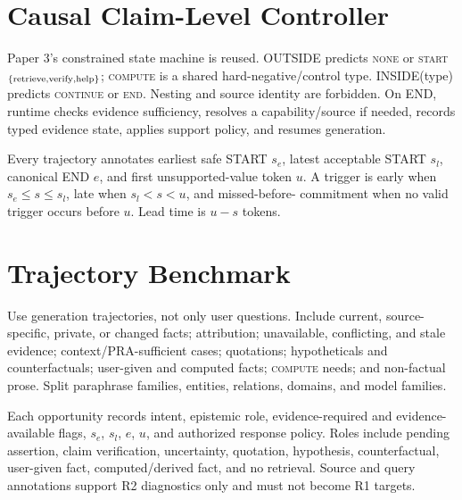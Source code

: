 \documentclass[10pt]{article}
\begin{document}
\section{Causal Claim-Level Controller}
Paper 3's constrained state machine is reused. OUTSIDE predicts \textsc{none}
or \textsc{start}$_{\{\rm retrieve,verify,help\}}$; \textsc{compute} is a shared
hard-negative/control type. INSIDE(type) predicts \textsc{continue} or
\textsc{end}. Nesting and source identity are forbidden. On END, runtime checks
evidence sufficiency, resolves a capability/source if needed, records typed
evidence state, applies support policy, and resumes generation.

Every trajectory annotates earliest safe START $s_e$, latest acceptable START
$s_l$, canonical END $e$, and first unsupported-value token $u$. A trigger is
early when $s_e\leq s\leq s_l$, late when $s_l<s<u$, and missed-before-
commitment when no valid trigger occurs before $u$. Lead time is $u-s$ tokens.

\section{Trajectory Benchmark}
Use generation trajectories, not only user questions. Include current,
source-specific, private, or changed facts; attribution; unavailable,
conflicting, and stale evidence; context/PRA-sufficient cases; quotations;
hypotheticals and counterfactuals; user-given and computed facts;
\textsc{compute} needs; and non-factual prose. Split paraphrase families,
entities, relations, domains, and model families.

Each opportunity records intent, epistemic role, evidence-required and
evidence-available flags, $s_e$, $s_l$, $e$, $u$, and authorized response
policy. Roles include pending assertion, claim verification, uncertainty,
quotation, hypothesis, counterfactual, user-given fact, computed/derived fact,
and no retrieval. Source and query annotations support R2 diagnostics only and
must not become R1 targets.
\end{document}
